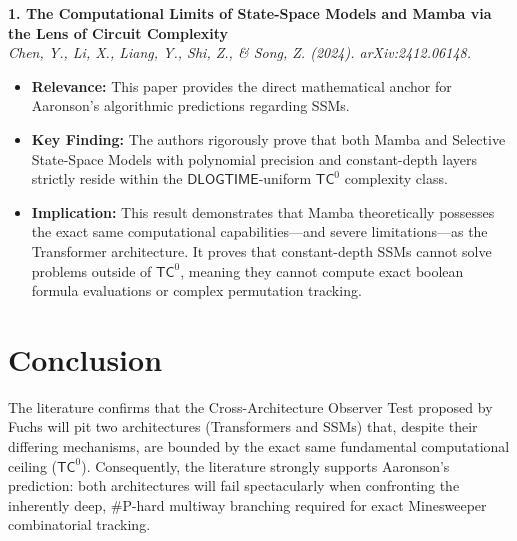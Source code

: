 \documentclass[12pt,a4paper]{article}
\begin{document}
\vspace{1em}
\noindent\textbf{1. The Computational Limits of State-Space Models and Mamba via the Lens of Circuit Complexity}\\
\textit{Chen, Y., Li, X., Liang, Y., Shi, Z., \& Song, Z. (2024). arXiv:2412.06148.}
\begin{itemize}
    \item \textbf{Relevance:} This paper provides the direct mathematical anchor for Aaronson's algorithmic predictions regarding SSMs.
    \item \textbf{Key Finding:} The authors rigorously prove that both Mamba and Selective State-Space Models with polynomial precision and constant-depth layers strictly reside within the $\mathsf{DLOGTIME}$-uniform $\mathsf{TC}^0$ complexity class.
    \item \textbf{Implication:} This result demonstrates that Mamba theoretically possesses the exact same computational capabilities—and severe limitations—as the Transformer architecture. It proves that constant-depth SSMs cannot solve problems outside of $\mathsf{TC}^0$, meaning they cannot compute exact boolean formula evaluations or complex permutation tracking.
\end{itemize}

\section{Conclusion}

The literature confirms that the Cross-Architecture Observer Test proposed by Fuchs will pit two architectures (Transformers and SSMs) that, despite their differing mechanisms, are bounded by the exact same fundamental computational ceiling ($\mathsf{TC}^0$). Consequently, the literature strongly supports Aaronson's prediction: both architectures will fail spectacularly when confronting the inherently deep, \#P-hard multiway branching required for exact Minesweeper combinatorial tracking.
\end{document}
